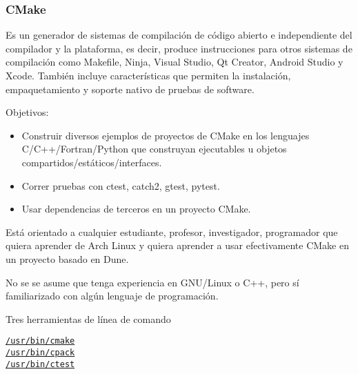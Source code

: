 




\begin{frame}[fragile]
	\frametitle{CMake}
	Es un generador de sistemas de compilación de código abierto e
	independiente del compilador y la plataforma, es decir, produce
	instrucciones para otros sistemas de compilación como Makefile,
	Ninja, Visual Studio, Qt Creator, Android Studio y Xcode.
	También incluye características que permiten la instalación,
	empaquetamiento y soporte nativo de pruebas de software.
	
	Objetivos:

	\begin{itemize}
		\item

		Construir diversos ejemplos de proyectos de CMake en los
		lenguajes C/C++/Fortran/Python que construyan ejecutables u
		objetos compartidos/estáticos/interfaces.

		\item

		Correr pruebas con ctest, catch2, gtest, pytest.

		\item

		Usar dependencias de terceros en un proyecto CMake.
	\end{itemize}

	Está orientado a cualquier estudiante, profesor, investigador,
	programador que quiera aprender de Arch Linux y quiera aprender
	a usar efectivamente CMake en un proyecto basado en Dune.

	No se se asume que tenga experiencia en GNU/Linux o C++, pero
	sí familiarizado con algún lenguaje de programación.


	Tres herramientas de línea de comando

	\begin{description}
		\item[\href{https://man.archlinux.org/man/cmake.1}{\lstinline{/usr/bin/cmake}}]

		\item[\href{https://man.archlinux.org/man/cpack.1}{\lstinline{/usr/bin/cpack}}]

		\item[\href{https://man.archlinux.org/man/ctest.1}{\lstinline{/usr/bin/ctest}}]
	\end{description}


\end{frame}
